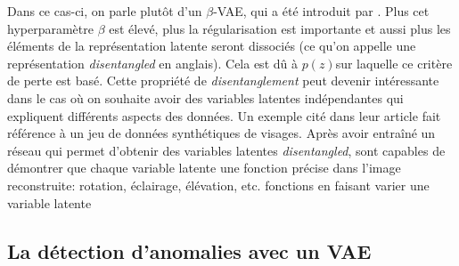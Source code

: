 Dans ce cas-ci, on parle plutôt d'un $\beta$-VAE, qui a été introduit par \cite{Higgins2017betaVAELB}. Plus cet hyperparamètre $\beta$ est élevé, plus la régularisation est importante et aussi plus les éléments de la représentation latente seront dissociés \DIFaddbegin {}\DIFaddend (ce qu'on appelle une représentation \textit{disentangled} en anglais). Cela est dû à \DIFdelbegin {}\DIFdelend \DIFaddbegin {}\textit{} \DIFaddend $p(z)$\DIFaddbegin \DIFadd{, }\DIFaddend sur laquelle ce critère de perte est basé\DIFdelbegin {}\DIFdelend . Cette propriété de \textit{disentanglement} peut devenir intéressante dans le cas où on souhaite avoir des variables latentes indépendantes qui expliquent différents aspects des données. Un exemple cité dans leur article fait référence à un jeu de données synthétiques de visages. Après avoir entraîné un réseau qui permet d'obtenir des variables latentes \textit{disentangled}, \DIFdelbegin {}\DIFdelend \DIFaddbegin {}\DIFaddend sont capables de démontrer que chaque variable latente \DIFdelbegin {}\DIFdelend \DIFaddbegin {}\DIFaddend une fonction précise dans l'image reconstruite: rotation, éclairage, élévation, etc. \DIFdelbegin {}\DIFdelend \DIFaddbegin {}\DIFaddend fonctions en faisant varier \DIFaddbegin {}\DIFaddend une variable latente \DIFdelbegin {}\DIFdelend \DIFaddbegin {}\DIFaddend 

\subsection{La détection d'anomalies avec un VAE}

